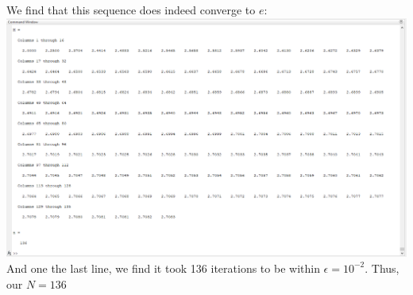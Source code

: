 \documentclass{article}
\begin{document}
\begin{enumerate}
    We find that this sequence does indeed converge to $e$: \\
    \includegraphics[scale = .5]{b.png}\\
    And one the last line, we find it took 136 iterations to be within $\epsilon = 
    10^{-2}$. Thus, our $N = 136$ 

    
    
\end{enumerate}
\end{document}
